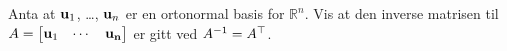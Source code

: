 



%
%


\begin{oppgave}
Anta at $\mathbf{u}_1$, \ldots, $\mathbf{u}_n$ er en ortonormal basis for $\mathbb{R}^n$. Vis at den inverse matrisen til $A=\begin{bmatrix}
\mathbf{u}_1 & \cdots & \mathbf{u_n}
\end{bmatrix}$ er gitt ved $A^{-1}=A^\top$.
\end{oppgave}


